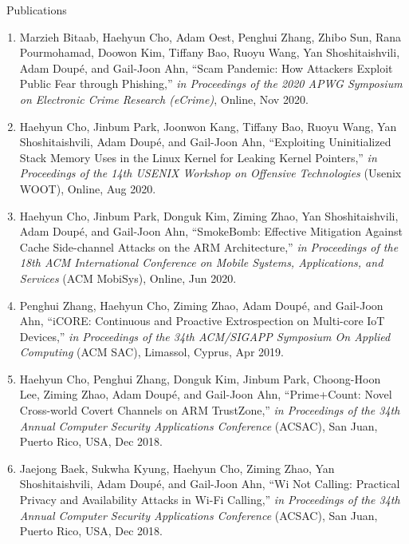 \documentclass{resume} %
\begin{document}
\begin{rSection}{\faGenderless~Publications}
\begin{enumerate}[leftmargin=0pt]
        \item Marzieh Bitaab, {Haehyun Cho}, Adam Oest, Penghui Zhang, Zhibo Sun, Rana Pourmohamad, Doowon Kim, Tiffany Bao, Ruoyu Wang, Yan Shoshitaishvili, Adam Doup\'e, and Gail-Joon Ahn,
        ``Scam Pandemic: How Attackers Exploit Public Fear through Phishing,''
        \emph{in Proceedings of the 2020 APWG Symposium on Electronic Crime Research {(eCrime)}},
        Online, Nov 2020.

        \item {Haehyun Cho}, Jinbum Park, Joonwon Kang, Tiffany Bao, Ruoyu Wang, Yan Shoshitaishvili, Adam Doup\'e, and Gail-Joon Ahn,
        ``Exploiting Uninitialized Stack Memory Uses in the Linux Kernel for Leaking Kernel Pointers,''
        \emph{in Proceedings of the 14th USENIX Workshop on Offensive Technologies} {(Usenix WOOT)},
        Online, Aug 2020.

        \item {Haehyun Cho}, Jinbum Park, Donguk Kim, Ziming Zhao, Yan Shoshitaishvili, Adam Doup\'e, and Gail-Joon Ahn,
		``SmokeBomb: Effective Mitigation Against Cache Side-channel Attacks on the ARM Architecture,'' 
        \emph{in Proceedings of the 18th ACM International Conference on Mobile Systems, Applications, and Services} {(ACM MobiSys)}, 
		Online, Jun 2020.

		\item Penghui Zhang, {Haehyun Cho}, Ziming Zhao, Adam Doup\'e, and Gail-Joon Ahn,
		``iCORE: Continuous and Proactive Extrospection on Multi-core IoT Devices,'' 
        \emph{in Proceedings of the 34th ACM/SIGAPP Symposium On Applied Computing} {(ACM SAC)}, 
		Limassol, Cyprus, Apr 2019.
     
        \item {Haehyun Cho}, Penghui Zhang, Donguk Kim, Jinbum Park, Choong-Hoon Lee, Ziming Zhao, Adam Doup\'e, and Gail-Joon Ahn,
		``Prime+Count: Novel Cross-world Covert Channels on ARM TrustZone,'' 
        \emph{in Proceedings of the 34th Annual Computer Security Applications Conference} {(ACSAC)}, 
		San Juan, Puerto Rico, USA, Dec 2018.

		\item Jaejong Baek, Sukwha Kyung, {Haehyun Cho}, Ziming Zhao, Yan Shoshitaishvili, Adam Doup\'e, and Gail-Joon Ahn,
		``Wi Not Calling: Practical Privacy and Availability Attacks in Wi-Fi Calling,'' 
        \emph{in Proceedings of the 34th Annual Computer Security Applications Conference} {(ACSAC)}, 
		San Juan, Puerto Rico, USA, Dec 2018.


\end{enumerate}
\end{rSection}
\end{document}
